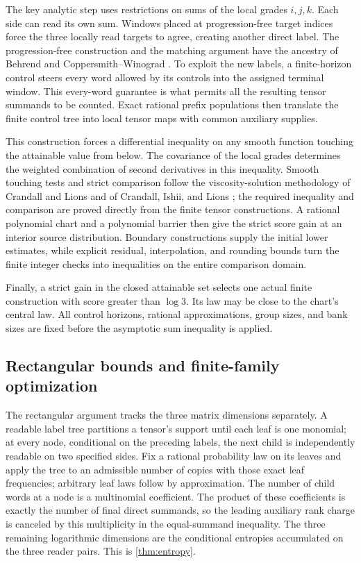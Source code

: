 The key analytic step uses restrictions on sums of the local grades
\(i,j,k\).  Each side can read its own sum.  Windows placed at
progression-free target indices force the three locally read targets
to agree, creating another direct label.  The progression-free
construction and the matching argument have the ancestry of Behrend
and Coppersmith--Winograd \cite{behrend,cw}.
To exploit the new labels, a finite-horizon control steers every word
allowed by its controls into the assigned terminal window.  This
every-word guarantee is what permits all the resulting tensor
summands to be counted.  Exact rational prefix populations then
translate the finite control tree into local tensor maps with common
auxiliary supplies.

This construction forces a differential inequality on any smooth
function touching the attainable value from below.  The covariance
of the local grades determines the weighted combination of second
derivatives in this inequality.  Smooth touching
tests and strict comparison follow the viscosity-solution methodology
of Crandall and Lions and of Crandall, Ishii, and Lions
\cite{crandalllions1983,crandallishiilions1992}; the required
inequality and comparison are proved directly from the finite tensor
constructions.  A rational polynomial chart and a polynomial barrier
then give the strict score gain at an interior source distribution.
Boundary constructions supply the initial lower estimates, while
explicit residual, interpolation, and rounding bounds turn the finite
integer checks into inequalities on the entire comparison domain.

Finally, a strict gain in the closed attainable set selects one
actual finite construction with score greater than \(\log3\).
Its law may be close to the chart's central law.  All control horizons,
rational approximations, group sizes, and bank sizes are fixed before
the asymptotic sum inequality is applied.

\subsection{Rectangular bounds and finite-family optimization}

The rectangular argument tracks the three matrix dimensions separately.
A readable label tree partitions a tensor's support until each leaf
is one monomial; at every node, conditional on the preceding labels,
the next child is independently readable on two specified sides.
Fix a rational probability law on its leaves and apply the tree to
an admissible number of copies with those exact leaf frequencies;
arbitrary leaf laws follow by approximation.  The number of child words
at a node is a multinomial coefficient.  The product of these
coefficients is exactly the number of final direct summands, so the
leading auxiliary rank charge is canceled by this multiplicity in
the equal-summand inequality.  The three remaining logarithmic
dimensions are the conditional entropies accumulated on the three
reader pairs.  This is \cref{thm:entropy}.


